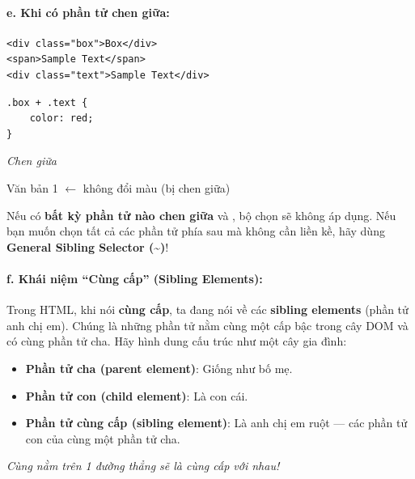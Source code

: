\paragraph{e. Khi có phần tử chen giữa:}
\begin{codeWindow}
\begin{lstlisting}[language=HTML5]
<div class="box">Box</div>
<span>Sample Text</span>
<div class="text">Sample Text</div>
\end{lstlisting}

\begin{lstlisting}[language=CSS3]
.box + .text {
    color: red;
}
\end{lstlisting}
\end{codeWindow}

\begin{browserWindow}
\sffamily\small
{} \par\vspace{4pt}
\textcolor{darkText}{\textit{Chen giữa}} \par\vspace{2pt}
\textcolor{darkText}{Văn bản 1} {\small\textcolor{gray!60}{$\leftarrow$ không đổi màu (bị  chen giữa)}} \par\vspace{4pt}
\end{browserWindow}

\begin{warnBox}
Nếu có \textbf{bất kỳ phần tử nào chen giữa}  và , bộ chọn sẽ không áp dụng. Nếu bạn muốn chọn tất cả các phần tử phía sau mà không cần liền kề, hãy dùng \textbf{General Sibling Selector (\textasciitilde{})}!
\end{warnBox}

\paragraph{f. Khái niệm ``Cùng cấp'' (Sibling Elements):}

\begin{conceptBox}
Trong HTML, khi nói \textbf{cùng cấp}, ta đang nói về các \textbf{sibling elements} (phần tử anh chị em). Chúng là những phần tử nằm cùng một cấp bậc trong cây DOM và có cùng phần tử cha. Hãy hình dung cấu trúc như một cây gia đình:
\begin{itemize}[leftmargin=1.5em, itemsep=2pt, parsep=0pt]
    \item \textbf{Phần tử cha (parent element)}: Giống như bố mẹ.
    \item \textbf{Phần tử con (child element)}: Là con cái.
    \item \textbf{Phần tử cùng cấp (sibling element)}: Là anh chị em ruột --- các phần tử con của cùng một phần tử cha.
\end{itemize}
\textit{Cùng nằm trên 1 đường thẳng sẽ là cùng cấp với nhau!}
\end{conceptBox}

